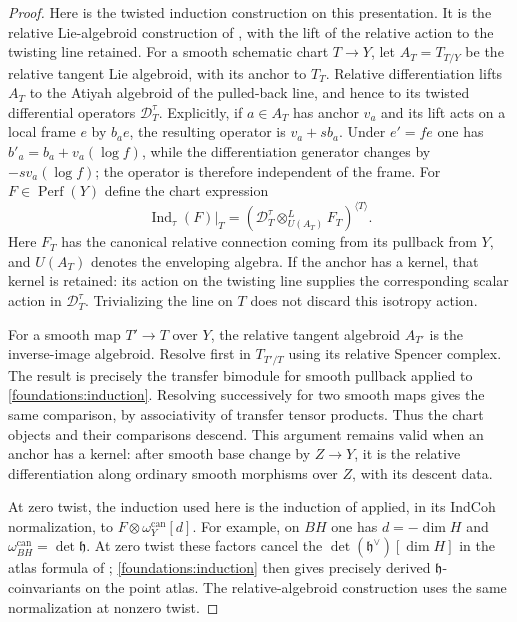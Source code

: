 \documentclass[11pt]{article}
\numberwithin{equation}{section}
\theoremstyle{definition}
\theoremstyle{remark}
\begin{document}
\begin{proof}
Here is the twisted induction construction on this presentation.
It is the relative Lie-algebroid construction of
\cite[Section~6.3, especially Lemmas~6.3.15--6.3.16]{DrinfeldGaitsgoryFiniteness},
with the lift of the relative action to the twisting line retained.
For a smooth schematic chart $T\to Y$, let $A_T=T_{T/Y}$ be the relative
tangent Lie algebroid, with its anchor to $T_T$.  Relative differentiation
lifts $A_T$ to the Atiyah algebroid of the pulled-back line, and hence to
its twisted differential operators $\mathcal D_T^\tau$.  Explicitly, if
$a\in A_T$ has anchor $v_a$ and its lift acts on a local frame $e$ by
$b_ae$, the resulting operator is $v_a+s b_a$.  Under $e'=fe$ one has
$b'_a=b_a+v_a(\log f)$, while the differentiation generator changes by
$-s v_a(\log f)$; the operator is therefore independent of the frame.
For
$F\in\operatorname{Perf}(Y)$ define the chart expression
\begin{equation}\label{foundations:induction}
 \operatorname{Ind}_\tau(F)|_T
 =\left(\mathcal D_T^\tau
       \mathop{\otimes}^{L}_{U(A_T)}F_T\right)^{\langle T\rangle}.
\end{equation}
Here $F_T$ has the canonical relative connection coming from its
pullback from $Y$, and $U(A_T)$ denotes the enveloping algebra.  If the
anchor has a kernel, that kernel is retained: its action on the twisting
line supplies the corresponding scalar action in
$\mathcal D_T^\tau$.  Trivializing the line on $T$ does not discard this
isotropy action.

For a smooth map $T'\to T$ over $Y$, the relative tangent algebroid
$A_{T'}$ is the inverse-image algebroid.  Resolve first in
$T_{T'/T}$ using its relative Spencer complex.  The result is precisely
the transfer bimodule for smooth pullback applied to
\eqref{foundations:induction}.  Resolving successively for two smooth
maps gives the same comparison, by associativity of transfer tensor
products.  Thus the chart objects and their comparisons descend.
This argument remains valid when an anchor has a kernel: after smooth
base change by $Z\to Y$, it is the relative differentiation along
ordinary smooth morphisms over $Z$, with its descent data.

At zero twist, the induction used here is the induction of
\cite[Section~6.3.21]{DrinfeldGaitsgoryFiniteness}
applied, in its IndCoh normalization, to
$F\otimes\omega_Y^{\mathrm{can}}[d]$.
For example, on $BH$ one has $d=-\dim H$ and
$\omega_{BH}^{\mathrm{can}}=\det\mathfrak h$.
At zero twist these factors cancel the
$\det(\mathfrak h^\vee)[\dim H]$ in the atlas formula of
\cite[Section~6.4.8]{DrinfeldGaitsgoryFiniteness};
\eqref{foundations:induction} then gives precisely derived
$\mathfrak h$-coinvariants on the point atlas.  The relative-algebroid
construction uses the same normalization at nonzero twist.


\end{proof}
\end{document}
